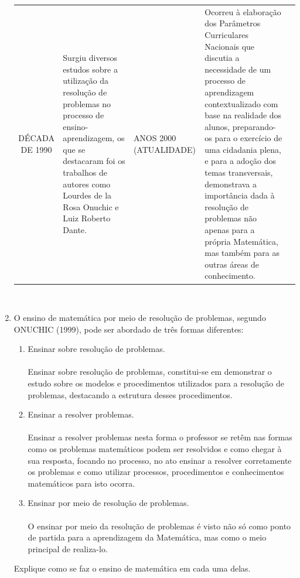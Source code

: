\documentclass[a4paper, 12pt]{article}
\begin{document}
\begin{enumerate}
\begin{center}
\begin{longtable}{| c | p{10cm} |}
    DÉCADA DE 1990 & Surgiu diversos estudos sobre a utilização da resolução de problemas no processo de ensino-aprendizagem, os que se destacaram foi os trabalhos de autores como Lourdes de la Rosa Onuchic e Luiz Roberto Dante.
 & \hline 
    ANOS 2000 (ATUALIDADE) & Ocorreu à elaboração dos Parâmetros Curriculares Nacionais que discutia a necessidade de um processo de aprendizagem contextualizado com base na realidade dos alunos, preparando-os para o exercício de uma cidadania plena, e para a adoção dos temas transversais, demonstrava a importância dada à resolução de problemas não apenas para a própria Matemática, mas também para as outras áreas de conhecimento.
 & \hline 
  \end{longtable} \\
  \end{center}
\item O ensino de matemática por meio de resolução de problemas, segundo ONUCHIC (1999), pode ser abordado de três formas diferentes: \\
  \begin{enumerate}
  \item Ensinar sobre resolução de problemas. \\ \\
      Ensinar sobre resolução de problemas, constitui-se em demonstrar o estudo sobre os modelos e procedimentos utilizados para a resolução de problemas, destacando a estrutura desses procedimentos.
    \item Ensinar a resolver problemas. \\ \\
      Ensinar a resolver problemas nesta forma o professor se retêm nas formas como os problemas matemáticos podem ser resolvidos e como chegar à sua resposta, focando no processo, no ato ensinar a resolver corretamente os problemas e como utilizar processos, procedimentos e conhecimentos matemáticos para isto ocorra.
      
    \item Ensinar por meio de resolução de problemas. \\ \\
       O ensinar por meio da resolução de problemas é visto não só como ponto de partida para a aprendizagem da Matemática, mas como o meio principal de realiza-lo.
  \end{enumerate}
  Explique como se faz o ensino de matemática em cada uma delas. \\ \\


\end{enumerate}
\end{document}
